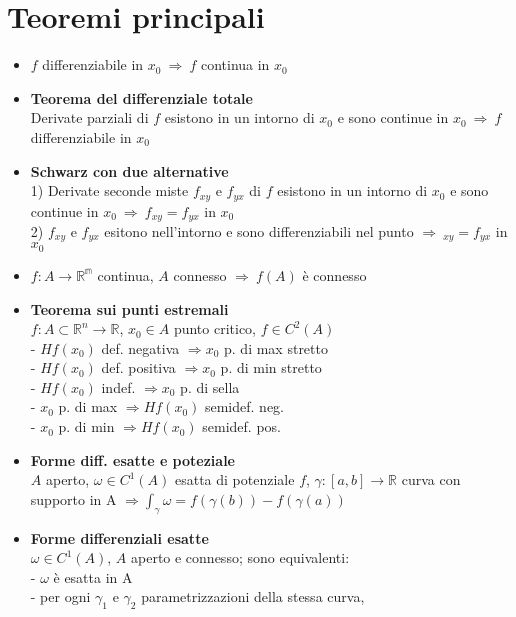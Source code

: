 \documentclass[a4paper,portrait,columns=3,5pt]{cheatsheet}
\begin{document}
\section{Teoremi principali}
\begin{itemize}
	\item $f$ differenziabile in $x_0~ \Rightarrow~f$ continua in $x_0 $
	\item \textbf{Teorema del differenziale totale} \\ Derivate parziali di $f$ esistono in un intorno di $x_0$ e sono continue in $x_0~\Rightarrow ~ f$ differenziabile in $x_0$ 
	\item \textbf{Schwarz con due alternative} \\ 1) Derivate seconde miste $f_{xy}$ e $f_{yx}$ di $f$ esistono in un intorno di $x_0$ e sono continue in $x_0~\Rightarrow~f_{xy} = f_{yx}$ in $x_0$
			\\ 2) $f_{xy}$ e $f_{yx}$ esitono nell'intorno e sono differenziabili nel punto $\Rightarrow~_{xy} = f_{yx}$ in $x_0$
	\item $f : A \rightarrow \mathbb{R^m}$ continua, $A$ connesso $\Rightarrow~f(A)$ è connesso
	\item \textbf{Teorema sui punti estremali}\\
			$f:A\subset \mathbb{R}^n \rightarrow \mathbb{R}$, $x_0 \in A$ punto critico, $f\in C^2(A)$\\
			- $Hf(x_0)$ def. negativa $\Rightarrow x_0$ p. di max stretto \\
			- $Hf(x_0)$ def. positiva $\Rightarrow x_0$ p. di min stretto \\
			- $Hf(x_0)$ indef. $\Rightarrow x_0$ p. di sella\\
			- $x_0$ p. di max $\Rightarrow Hf(x_0)$ semidef. neg.\\
			- $x_0$ p. di min $\Rightarrow Hf(x_0)$ semidef. pos.
	\item \textbf{Forme diff. esatte e poteziale}\\
			$A$ aperto, $\omega\in C^1(A)$ esatta di potenziale $f$, $\gamma :[a,b]\rightarrow \mathbb{R}$ curva con supporto in A 
			$\Rightarrow \int_\gamma \omega = f(\gamma(b)) - f(\gamma(a))$
	\item \textbf{Forme differenziali esatte} \\
			$\omega \in C^1(A)$, $A$ aperto e connesso; sono equivalenti:\\
				- $\omega$ è esatta in A\\
				- per ogni $\gamma_1$ e $\gamma_2$ parametrizzazioni della stessa curva, 

\end{itemize}
\end{document}
